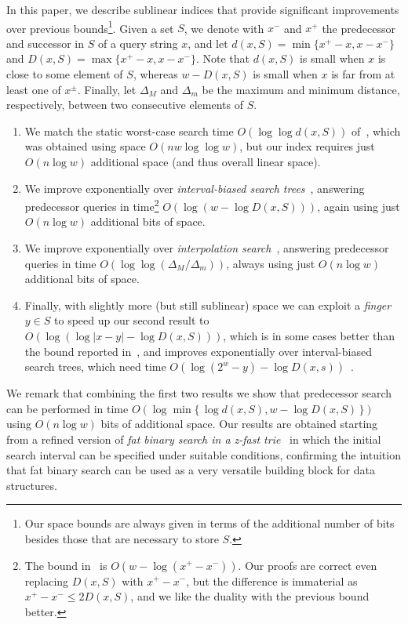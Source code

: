 \documentclass{article}
\newcommand{\?}{\mskip1.5mu}
\begin{document}
In this paper, we describe sublinear indices that
provide significant improvements over previous bounds\footnote{Our space bounds
are always given in terms of the additional number of bits besides those that
are necessary to store $S$.}. Given a set $S$, we denote with $x^-$ and $x^+$
the predecessor and successor in $S$ of a query string $x$, and let $d(x,S) =
\min\{x^+-x,x-x^-\}$ and $D(x,S) = \max\{x^+-x,x-x^-\}$. Note that $d(x,S)$ is small when $x$ is close to some element of $S$, whereas $w-D(x,S)$
is small when $x$ is far from at least one of $x^\pm$.
Finally, let $\Delta_M$ and $\Delta_m$ be the maximum and minimum distance, respectively,
between two consecutive elements of $S$.

\begin{enumerate}
  \item We match the static worst-case search time $O(\log\log d(x,S))$
  of~\cite{BDDFLSUBU}, which was obtained using space $O(n w \log
  \log w)$, but our index requires just $O(n\log w)$ additional space (and
  thus overall linear space).
  \item We improve exponentially over \emph{interval-biased search
  trees}~\cite{BLRRAGCS}, answering predecessor queries in time\footnote{The
  bound in~\cite{BLRRAGCS} is $O(w-\log(x^+-x^-))$. Our proofs are correct
  even replacing $D(x,S)$ with $x^+-x^-$, but the difference is immaterial as
  $x^+-x^-\leq 2D(x,S)$, and we like the duality with the previous bound
  better.} $O(\log(w-\log D(x,S)))$, again using just $O(n\log w)$ additional bits of
  space.
  \item We improve exponentially over \emph{interpolation
  search}~\cite{DJPISND}, answering
  predecessor queries in time $O(\log\log(\Delta_M/\Delta_m))$,
  always using just $O(n\log w)$ additional bits of space.
  \item Finally, with slightly more (but still sublinear) space we can exploit a
  \emph{finger} $y\in S$ to speed up our second result to $O(\log(\log|x-y|-\log D(x,S)))$, which is in
  some cases better than the bound reported
  in~\cite{AnTDOSEST}, and improves exponentially over
  interval-biased search trees, which need time  $O(\log(2^w-y)-\log
  D(x,s))$~\cite{BLRRAGCS}.
\end{enumerate}

We remark that combining the first two results we show that predecessor search can be 
performed in time  $O(\log \min \{\,\log d(x,S),w-\log D(x,S)\,\})$ using $O(n\log w)$ 
bits of additional space. Our results are obtained starting from a refined version of
\emph{fat binary search in a z-fast trie}~\cite{BBPMMPH} in which the initial search interval
can be specified under suitable conditions, confirming the intuition that fat
binary search can be used as a very versatile building block for data structures.
\end{document}
